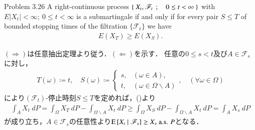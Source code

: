 	\begin{itembox}[l]{Problem 3.26}
		A right-continuous process $\left\{\ X_t,\mathscr{F}_t\ \, ; \quad 0 \leq t < \infty\ \right\}$ with $E|X_t| < \infty;\ 0 \leq t < \infty$
		is a submartingale if and only if for every pair $S \leq T$ of bounded stopping times of 
		the filtration $\{\mathscr{F}_t\}$ we have
		\begin{align}
			E(X_T) \geq E(X_S).
			\label{chapter_1_Problem_3_26_1}
		\end{align}
	\end{itembox}
	
	\begin{prf}
		$(\Rightarrow)$は任意抽出定理より従う．$(\Leftarrow)$を示す．
		任意の$0 \leq s < t$及び$A \in \mathscr{F}_s$に対し，
		\begin{align}
			T(\omega) \coloneqq t,
			\quad 
			S(\omega) \coloneqq
			\begin{cases}
				s, & (\omega \in A), \\
				t, & (\omega \in \Omega \backslash A)
			\end{cases},
			\quad (\forall \omega \in \Omega)
		\end{align}
		により$(\mathscr{F}_t)$-停止時刻$S \leq T$を定めれば，()より
		\begin{align}
			\int_A X_t\ dP = \int_\Omega X_T\ dP - \int_{\Omega \backslash A} X_t\ dP
			\geq \int_\Omega X_S\ dP - \int_{\Omega \backslash A} X_t\ dP
			= \int_A X_s\ dP
		\end{align}
		が成り立ち，$A \in \mathscr{F}_s$の任意性より$\operatorname{E} \left[ X_t \ \middle|\ \mathscr{F}_s \right] \geq X_s\ \mbox{a.s. $P$}$となる．
		\QED
	\end{prf}